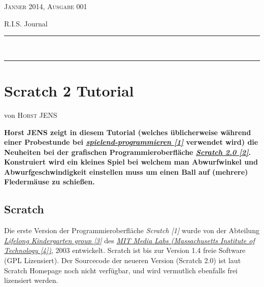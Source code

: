 \documentclass[10pt,a4paper,ngerman,twoside]{article} %
\newcommand{\HorRule}[1]{\noindent\rule{\linewidth}{#1}} %
\newcommand{\NewsletterName}[1]{ %
\begin{center}
\Huge \usefont{T1}{fvs}{b}{n} %
#1
\end{center}	
\par \normalsize \normalfont}
\newcommand{\JournalIssue}[1]{ %
\hfill \textsc{Jänner 2014, Ausgabe 001}
\par \normalsize \normalfont}
\newcommand{\NewsItem}[1]{ %
\usefont{T1}{fvs}{n}{n} %
\vspace{24pt}\large #1\vspace{3pt} %
\par \normalsize \normalfont}
\newcommand{\NewsAuthor}[1]{ %
\hfill von \textsc{#1} \vspace{20pt} %
\par \normalfont}
\begin{document}
\JournalIssue{1} %
\NewsletterName{R.I.S. Journal} %
\noindent\HorRule{3pt} \\[-0.75\baselineskip] %
\HorRule{1pt} %




%

\NewsItem{}
\section*{Scratch 2 Tutorial}
\label{scratch}
\NewsAuthor{Horst JENS}

\textbf{Horst JENS zeigt in diesem Tutorial (welches üblicherweise während einer Probestunde bei \href{http://spielend-programmieren.at}{\textit{spielend-programmieren [1]}} verwendet wird) die Neuheiten bei der grafischen Programmieroberfläche \href{http://scratch.mit.ed}{\textit{Scratch 2.0 [2]}}. Konstruiert wird ein kleines Spiel bei welchem man Abwurfwinkel und Abwurfgeschwindigkeit einstellen muss um einen Ball auf (mehrere) Fledermäuse zu schießen.}

\subsection*{Scratch}

Die erste Version der Programmieroberfläche \textit{Scratch [1]} wurde von der Abteilung \href{http://llk.media.mit.edu/}{\textit{Lifelong Kindergarten group [3]}} des \href{http://www.media.mit.edu/}{\textit{MIT Media Labs (Massachusetts Institute of Technology [4])}},  2003 entwickelt. Scratch ist bis zur Version 1.4 freie Software (GPL Lizensiert). Der Sourcecode der neueren Version (Scratch 2.0) ist laut Scratch Homepage noch nicht verfügbar, und wird vermutlich ebenfalls frei lizensiert werden. 
\end{document}
